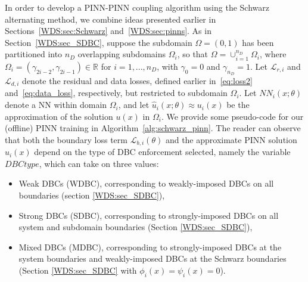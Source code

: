 \documentclass[oneside,final]{csri23}
\begin{document}
In order to develop a PINN-PINN coupling algorithm using the Schwarz alternating method, we combine ideas presented earlier in Sections~\ref{WDS:sec:Schwarz} and~\ref{WDS:sec:pinns}. As in Section~\ref{WDS:sec_SDBC}, suppose the subdomain $\Omega = (0,1)$ has been partitioned into $n_D$ overlapping subdomains $\Omega_i$, so that $\Omega = \cup_{i=1}^{n_{D}} \Omega_i$, where $\Omega_{i} = (\gamma_{2i-2}, \gamma_{2i-1}) \in \mathbb{R}$ for $i = 1, ..., n_D$, with $\gamma_0 = 0$ and $\gamma_{n_{D}} = 1$. Let $\mathcal{L}_{r,i}$ and $\mathcal{L}_{d,i}$ denote the residual and data losses, defined earlier in~\eqref{eq:loss2} and~\eqref{eq:data_loss}, respectively, but restricted to subdomain $\Omega_i$. Let $NN_i(x; \theta)$ denote a NN within domain $\Omega_i$, and let $\hat{u}_i(x;\theta) \approx u_i(x)$ be the approximation of the solution $u(x)$ in $\Omega_i$. We provide some pseudo-code for our (offline) PINN training in Algorithm~\ref{alg:schwarz_pinn}.  The reader can observe that both the boundary loss term $\mathcal{L}_{b,i}(\theta)$ and the approximate PINN solution $\hat{u}_i(x)$ depend on the type of DBC enforcement selected, namely the variable $DBCtype$, which can take on three values: 
\begin{itemize}
    \item Weak DBCs (WDBC), corresponding to weakly-imposed DBCs on all boundaries (section \ref{WDS:sec_SDBC}),
    \item Strong DBCs (SDBC), corresponding to strongly-imposed DBCs on all system and subdomain boundaries (Section \ref{WDS:sec_SDBC}),
    \item Mixed DBCs (MDBC), corresponding to strongly-imposed DBCs at the system boundaries and weakly-imposed DBCs at the Schwarz boundaries (Section \ref{WDS:sec_SDBC} with $\phi_i(x) = \psi_i(x) = 0$).
    \end{itemize}
\end{document}
